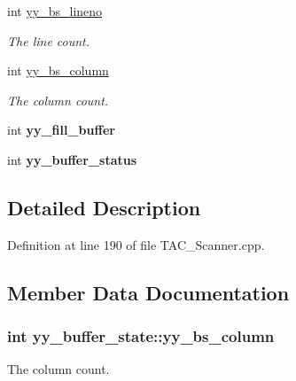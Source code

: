 \begin{DoxyCompactItemize}
\item 
int \hyperlink{structyy__buffer__state_a818e94bc9c766e683c60df1e9fd01199}{yy\-\_\-bs\-\_\-lineno}
\begin{DoxyCompactList}\small\item\em The line count. \end{DoxyCompactList}\item 
int \hyperlink{structyy__buffer__state_a10c4fcd8be759e6bf11e6d3e8cdb0307}{yy\-\_\-bs\-\_\-column}
\begin{DoxyCompactList}\small\item\em The column count. \end{DoxyCompactList}\item 
\hypertarget{structyy__buffer__state_a63d2afbb1d79a3fc63df9e12626f827d}{int {\bfseries yy\-\_\-fill\-\_\-buffer}}\label{structyy__buffer__state_a63d2afbb1d79a3fc63df9e12626f827d}

\item 
\hypertarget{structyy__buffer__state_a70fd925d37a2f0454fbd0def675d106c}{int {\bfseries yy\-\_\-buffer\-\_\-status}}\label{structyy__buffer__state_a70fd925d37a2f0454fbd0def675d106c}

\end{DoxyCompactItemize}


\subsection{Detailed Description}


Definition at line 190 of file T\-A\-C\-\_\-\-Scanner.\-cpp.



\subsection{Member Data Documentation}
\hypertarget{structyy__buffer__state_a10c4fcd8be759e6bf11e6d3e8cdb0307}{
\subsubsection[{yy\-\_\-bs\-\_\-column}]{\setlength{\rightskip}{0pt plus 5cm}int yy\-\_\-buffer\-\_\-state\-::yy\-\_\-bs\-\_\-column}}\label{structyy__buffer__state_a10c4fcd8be759e6bf11e6d3e8cdb0307}


The column count. 



